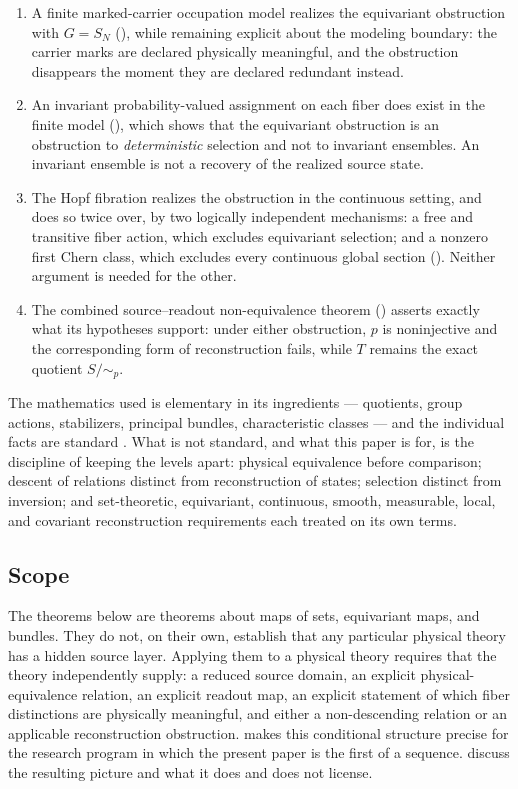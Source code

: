 \documentclass[11pt,reqno]{amsart}
\theoremstyle{plain}
\theoremstyle{definition}
\theoremstyle{remark}
\begin{document}
\begin{enumerate}
\item A finite marked-carrier occupation model realizes the equivariant obstruction with $G=S_{N}$ (), while remaining explicit about the modeling boundary: the carrier marks are declared physically meaningful, and the obstruction disappears the moment they are declared redundant instead.

\item An invariant probability-valued assignment on each fiber does exist in the finite model (), which shows that the equivariant obstruction is an obstruction to \emph{deterministic} selection and not to invariant ensembles. An invariant ensemble is not a recovery of the realized source state.

\item The Hopf fibration realizes the obstruction in the continuous setting, and does so twice over, by two logically independent mechanisms: a free and transitive fiber action, which excludes equivariant selection; and a nonzero first Chern class, which excludes every continuous global section (). Neither argument is needed for the other.

\item The combined source--readout non-equivalence theorem () asserts exactly what its hypotheses support: under either obstruction, $p$ is noninjective and the corresponding form of reconstruction fails, while $T$ remains the exact quotient $S/\!\sim_{p}$.
\end{enumerate}

The mathematics used is elementary in its ingredients --- quotients, group actions, stabilizers, principal bundles, characteristic classes --- and the individual facts are standard \cite{Lang,Bredon,KobayashiNomizu,Husemoller,Steenrod,Hatcher,MilnorStasheff,BottTu,Naber}. What is not standard, and what this paper is for, is the discipline of keeping the levels apart: physical equivalence before comparison; descent of relations distinct from reconstruction of states; selection distinct from inversion; and set-theoretic, equivariant, continuous, smooth, measurable, local, and covariant reconstruction requirements each treated on its own terms.

\subsection*{Scope}

The theorems below are theorems about maps of sets, equivariant maps, and bundles. They do not, on their own, establish that any particular physical theory has a hidden source layer. Applying them to a physical theory requires that the theory independently supply: a reduced source domain, an explicit physical-equivalence relation, an explicit readout map, an explicit statement of which fiber distinctions are physically meaningful, and either a non-descending relation or an applicable reconstruction obstruction.  makes this conditional structure precise for the research program in which the present paper is the first of a sequence.  discuss the resulting picture and what it does and does not license.
\end{document}
